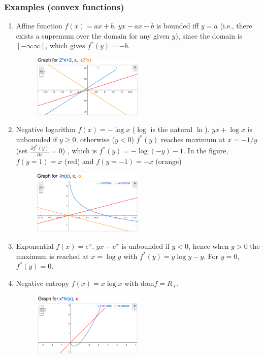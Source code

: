 \subsubsection{\bf Examples (convex functions)}
\begin{enumerate}
  \item{Affine function} $f(x)= ax+ b$. $yx- ax- b$ is bounded iff $y= a$ (i.e., there exists a supremum over the domain for any given $y$), since the domain is $[-\infty \infty]$, which gives $f^*(y) = -b$.

  \begin{figure}[H]
     \includegraphics[width=0.5\textwidth]{conj_affine}
  \end{figure}

  \item{Negative logarithm} $f(x)= -\log x$ ($\log$ is the natural $\ln$). $yx+ \log x$  is unbounded if $y\ge 0$, otherwise ($y< 0$) $f^*(y)$ reaches maximum at $x=-1/y$ (set $\frac{\partial f^*(y)}{\partial x}= 0$) , which is $f^*(y)=-\log(-y) - 1$.
  In the figure, $f(y= 1)=x$ (red) and $f(y= -1)=-x$ (orange)

  \begin{figure}[H]
     \includegraphics[width=0.5\textwidth]{conj_neg_log}
  \end{figure}

  \item{Exponential} $f(x)= e^x$. $yx- e^x$ is unbounded if $y< 0$, hence when $y> 0$ the maximum is reached at $x= \log y$ with $f^*(y)= y\log y- y$.
	For $y= 0$, $f^*(y)= 0$. 

  \item{Negative entropy} $f(x)= x\log x$ with $\text{dom} f= R_+$.
  
  \begin{figure}[H]   
     \includegraphics[width=0.5\textwidth]{conj_neg_entropy}
  \end{figure}


\end{enumerate}
